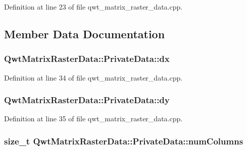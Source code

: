 Definition at line 23 of file qwt\-\_\-matrix\-\_\-raster\-\_\-data.\-cpp.



\subsection{Member Data Documentation}
\hypertarget{class_qwt_matrix_raster_data_1_1_private_data_a950781bd812f80ee559854865ab11dd3}{
\subsubsection[{dx}]{ Qwt\-Matrix\-Raster\-Data\-::\-Private\-Data\-::dx}}\label{class_qwt_matrix_raster_data_1_1_private_data_a950781bd812f80ee559854865ab11dd3}


Definition at line 34 of file qwt\-\_\-matrix\-\_\-raster\-\_\-data.\-cpp.

\hypertarget{class_qwt_matrix_raster_data_1_1_private_data_a2a3383c2af44ad624aa6619b0150d72e}{
\subsubsection[{dy}]{ Qwt\-Matrix\-Raster\-Data\-::\-Private\-Data\-::dy}}\label{class_qwt_matrix_raster_data_1_1_private_data_a2a3383c2af44ad624aa6619b0150d72e}


Definition at line 35 of file qwt\-\_\-matrix\-\_\-raster\-\_\-data.\-cpp.

\hypertarget{class_qwt_matrix_raster_data_1_1_private_data_acee52903d07bad84e39907baf7c85131}{
\subsubsection[{num\-Columns}]{\setlength{\rightskip}{0pt plus 5cm}size\-\_\-t Qwt\-Matrix\-Raster\-Data\-::\-Private\-Data\-::num\-Columns}}\label{class_qwt_matrix_raster_data_1_1_private_data_acee52903d07bad84e39907baf7c85131}


